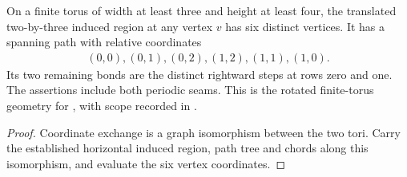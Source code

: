 \begin{lemma}
    \label{thm:peps_vertical_two_plaquette_geometry}
    \leanok
    On a finite torus of width at least three and height at least four, the
    translated two-by-three induced region at any vertex $v$ has six distinct
    vertices. It has a spanning path with relative coordinates
    \begin{align}
        (0,0),(0,1),(0,2),(1,2),(1,1),(1,0).
    \end{align}
    Its two remaining bonds are the distinct rightward steps at rows zero and
    one. The assertions include both periodic seams. This is the rotated
    finite-torus geometry for \cite[Theorem~6.16]{Schuch2010PEPS}, with scope
    recorded in \cite{gap:rmp_peps_quantum_double_g_isometry}.
\end{lemma}

\begin{proof}\leanok
    Coordinate exchange is a graph isomorphism between the two tori. Carry
    the established horizontal induced region, path tree and chords along this
    isomorphism, and evaluate the six vertex coordinates.
\end{proof}

